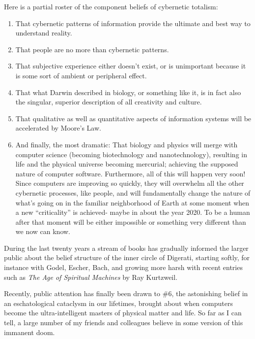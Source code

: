 \documentclass[letterpaper,12pt,english]{sphinxmanual}
\begin{document}
Here is a partial roster of the component beliefs of cybernetic totalism:
\begin{enumerate}
\item {} 
That cybernetic patterns of information provide the ultimate and best way to understand reality.

\item {} 
That people are no more than cybernetic patterns.

\item {} 
That subjective experience either doesn't exist, or is unimportant because it is some sort of ambient or peripheral effect.

\item {} 
That what Darwin described in biology, or something like it, is in fact also the singular, superior description of all creativity and culture.

\item {} 
That qualitative as well as quantitative aspects of information systems will be accelerated by Moore's Law.

\item {} 
And finally, the most dramatic: That biology and physics will merge with computer science (becoming biotechnology and nanotechnology), resulting in life and the physical universe becoming mercurial; achieving the supposed nature of computer software. Furthermore, all of this will happen very soon! Since computers are improving so quickly, they will overwhelm all the other cybernetic processes, like people, and will fundamentally change the nature of what's going on in the familiar neighborhood of Earth at some moment when a new ``criticality'' is achieved- maybe in about the year 2020. To be a human after that moment will be either impossible or something very different than we now can know.

\end{enumerate}

During the last twenty years a stream of books has gradually informed the larger public about the belief structure of the inner circle of Digerati, starting softly, for instance with Godel, Escher, Bach, and growing more harsh with recent entries such as \emph{The Age of Spiritual Machines} by Ray Kurtzweil.

Recently, public attention has finally been drawn to \#6, the astonishing belief in an eschatological cataclysm in our lifetimes, brought about when computers become the ultra-intelligent masters of physical matter and life. So far as I can tell, a large number of my friends and colleagues believe in some version of this immanent doom.
\end{document}
